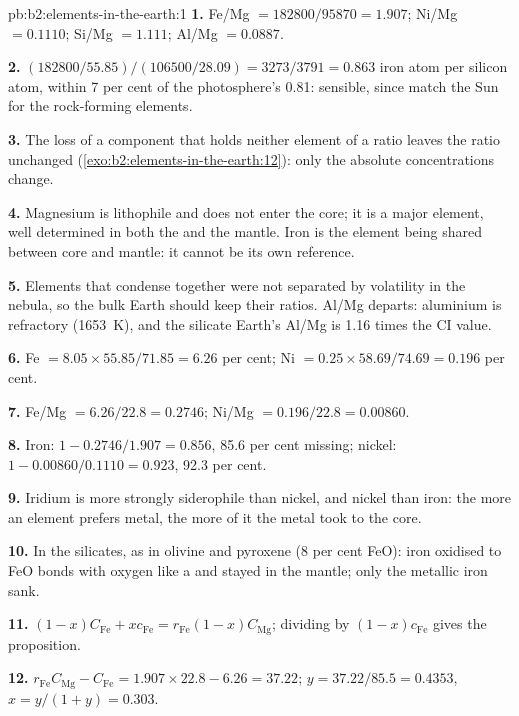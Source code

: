 \begin{solution}{pb:b2:elements-in-the-earth:1}
\textbf{1.} Fe/Mg $= \num{182800}/\num{95870} = 1.907$; Ni/Mg $= 0.1110$; Si/Mg $=
1.111$; Al/Mg $= 0.0887$.

\textbf{2.} $(\num{182800}/55.85)/(\num{106500}/28.09) = 3273/3791 = 0.863$ iron atom per
silicon atom, within 7 per cent of the photosphere's 0.81: sensible, since 
match the Sun for the rock-forming elements.

\textbf{3.} The loss of a component that holds neither element of a ratio leaves the
ratio unchanged (\cref{exo:b2:elements-in-the-earth:12}): only the absolute concentrations change.

\textbf{4.} Magnesium is lithophile and does not enter the core; it is a major element,
well determined in both the  and the mantle. Iron is the element being shared
between core and mantle: it cannot be its own reference.

\textbf{5.} Elements that condense together were not separated by volatility in the
nebula, so the bulk Earth should keep their ratios. Al/Mg departs: aluminium is
refractory (\qty{1653}{K}), and the silicate Earth's Al/Mg is 1.16 times the CI value.

\textbf{6.} Fe $= 8.05\times55.85/71.85 = 6.26$ per cent; Ni $= 0.25\times58.69/74.69 =
0.196$ per cent.

\textbf{7.} Fe/Mg $= 6.26/22.8 = 0.2746$; Ni/Mg $= 0.196/22.8 = 0.00860$.

\textbf{8.} Iron: $1 - 0.2746/1.907 = 0.856$, 85.6 per cent missing; nickel:
$1 - 0.00860/0.1110 = 0.923$, 92.3 per cent.

\textbf{9.} Iridium is more strongly siderophile than nickel, and nickel than iron:
the more an element prefers metal, the more of it the metal took to the core.

\textbf{10.} In the silicates, as  in olivine and pyroxene (8 per cent FeO):
iron oxidised to FeO bonds with oxygen like a  and stayed in the
mantle; only the metallic iron sank.

\textbf{11.} $(1-x)C_{\mathrm{Fe}} + xc_{\mathrm{Fe}} = r_{\mathrm{Fe}}(1-x)C_{\mathrm{Mg}}$;
dividing by $(1-x)c_{\mathrm{Fe}}$ gives the proposition.

\textbf{12.} $r_{\mathrm{Fe}}C_{\mathrm{Mg}} - C_{\mathrm{Fe}} = 1.907\times22.8 - 6.26 =
37.22$; $y = 37.22/85.5 = 0.4353$, $x = y/(1+y) = 0.303$.


\end{solution}
